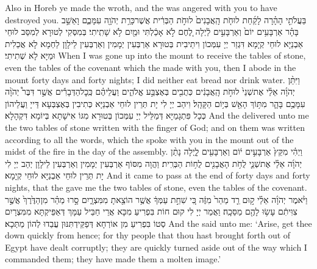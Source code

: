 {Also in Horeb ye made the \lord\space wroth, and the \lord\space was angered with you to have destroyed you.}{}
{בַּעֲלֹתִ֣י הָהָ֗רָה לָקַ֜חַת לוּחֹ֤ת הָֽאֲבָנִים֙ לוּחֹ֣ת הַבְּרִ֔ית אֲשֶׁר\maqqaf כָּרַ֥ת יְהֹוָ֖ה עִמָּכֶ֑ם וָאֵשֵׁ֣ב בָּהָ֗ר אַרְבָּעִ֥ים יוֹם֙ וְאַרְבָּעִ֣ים לַ֔יְלָה לֶ֚חֶם לֹ֣א אָכַ֔לְתִּי וּמַ֖יִם לֹ֥א שָׁתִֽיתִי׃}
{בְּמִסְּקִי לְטוּרָא לְמִסַּב לוּחֵי אַבְנַיָּא לוּחֵי קְיָמָא דִּגְזַר יְיָ עִמְּכוֹן וִיתֵיבִית בְּטוּרָא אַרְבְּעִין יְמָמִין וְאַרְבְּעִין לֵילָוָן לַחְמָא לָא אֲכַלִית וּמַיָּא לָא שְׁתִיתִי׃}
{When I was gone up into the mount to receive the tables of stone, even the tables of the covenant which the \lord\space made with you, then I abode in the mount forty days and forty nights; I did neither eat bread nor drink water.}{}
{וַיִּתֵּ֨ן יְהֹוָ֜ה אֵלַ֗י אֶת\maqqaf שְׁנֵי֙ לוּחֹ֣ת הָֽאֲבָנִ֔ים כְּתֻבִ֖ים בְּאֶצְבַּ֣ע אֱלֹהִ֑ים וַעֲלֵיהֶ֗ם כְּֽכׇל\maqqaf הַדְּבָרִ֡ים אֲשֶׁ֣ר דִּבֶּר֩ יְהֹוָ֨ה עִמָּכֶ֥ם בָּהָ֛ר מִתּ֥וֹךְ הָאֵ֖שׁ בְּי֥וֹם הַקָּהָֽל׃}
{וִיהַב יְיָ לִי יָת תְּרֵין לוּחֵי אַבְנַיָּא כְּתִיבִין בְּאֶצְבְּעָא דַּייָ וַעֲלֵיהוֹן כְּכָל פִּתְגָמַיָּא דְּמַלֵּיל יְיָ עִמְּכוֹן בְּטוּרָא מִגּוֹ אִישָׁתָא בְּיוֹמָא דִּקְהָלָא׃}
{And the \lord\space delivered unto me the two tables of stone written with the finger of God; and on them was written according to all the words, which the \lord\space spoke with you in the mount out of the midst of the fire in the day of the assembly.}{}
{וַיְהִ֗י מִקֵּץ֙ אַרְבָּעִ֣ים י֔וֹם וְאַרְבָּעִ֖ים לָ֑יְלָה נָתַ֨ן יְהֹוָ֜ה אֵלַ֗י אֶת\maqqaf שְׁנֵ֛י לֻחֹ֥ת הָאֲבָנִ֖ים לֻח֥וֹת הַבְּרִֽית׃}
{וַהֲוָה מִסּוֹף אַרְבְּעִין יְמָמִין וְאַרְבְּעִין לֵילָוָן יְהַב יְיָ לִי יָת תְּרֵין לוּחֵי אַבְנַיָּא לוּחֵי קְיָמָא׃}
{And it came to pass at the end of forty days and forty nights, that the \lord\space gave me the two tables of stone, even the tables of the covenant.}{}
{וַיֹּ֨אמֶר יְהֹוָ֜ה אֵלַ֗י ק֣וּם רֵ֤ד מַהֵר֙ מִזֶּ֔ה כִּ֚י שִׁחֵ֣ת עַמְּךָ֔ אֲשֶׁ֥ר הוֹצֵ֖אתָ מִמִּצְרָ֑יִם סָ֣רוּ מַהֵ֗ר מִן\maqqaf הַדֶּ֙רֶךְ֙ אֲשֶׁ֣ר צִוִּיתִ֔ם עָשׂ֥וּ לָהֶ֖ם מַסֵּכָֽה׃}
{וַאֲמַר יְיָ לִי קוּם חוֹת בִּפְרִיעַ מִכָּא אֲרֵי חַבֵּיל עַמָּךְ דְּאַפֵּיקְתָּא מִמִּצְרָיִם סְטוֹ בִּפְרִיעַ מִן אוֹרְחָא דְּפַקֵּידְתִּנּוּן עֲבַדוּ לְהוֹן מַתְּכָא׃}
{And the \lord\space said unto me: ‘Arise, get thee down quickly from hence; for thy people that thou hast brought forth out of Egypt have dealt corruptly; they are quickly turned aside out of the way which I commanded them; they have made them a molten image.’}{}
